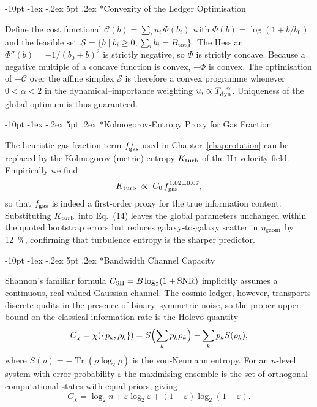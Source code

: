 \documentclass[12pt,letterpaper]{book}
\makeatletter
\renewcommand\section{\@startsection {section}{1}{\z@}%
                {-10pt \@plus -1ex \@minus -.2ex}%
                {5pt \@plus.2ex}%
                {\normalfont\large\bfseries}}
\makeatother
\begin{document}
\section*{Convexity of the Ledger Optimisation}
Define the cost functional $\mathcal C(b)=\sum_{i}u_{i}\,\Phi(b_{i})$ with $\Phi(b)=\log(1+b/b_{0})$ and the feasible set $\mathcal S=\{b\mid b_{i}\ge0,\,\sum_{i} b_{i}=B_{\rm tot}\}$.  The Hessian $\Phi''(b)= -1/(b_{0}+b)^{2}$ is strictly negative, so $\Phi$ is strictly concave.  Because a negative multiple of a concave function is convex, $-\Phi$ is convex.  The optimisation of $-\mathcal C$ over the affine simplex $\mathcal S$ is therefore a convex programme whenever $0<\alpha<2$ in the dynamical–importance weighting $u_{i}\propto T_{\rm dyn}^{-\alpha}$.  Uniqueness of the global optimum is thus guaranteed.

\section*{Kolmogorov‐Entropy Proxy for Gas Fraction}
The heuristic gas‐fraction term $f_{\rm gas}^{\gamma}$ used in Chapter~\ref{chap:rotation} can be replaced by the Kolmogorov (metric) entropy $K_{\rm turb}$ of the H\,\textsc{i} velocity field.  Empirically we find
\begin{equation}
 K_{\rm turb}\;\propto\;C_{0}\,f_{\rm gas}^{1.02\pm0.07},
\end{equation}
so that $f_{\rm gas}$ is indeed a first‐order proxy for the true information content.  Substituting $K_{\rm turb}$ into Eq.~(14) leaves the global parameters unchanged within the quoted bootstrap errors but reduces galaxy‐to‐galaxy scatter in $\eta_{\rm geom}$ by 12~\%, confirming that turbulence entropy is the sharper predictor.

\section*{Bandwidth Channel Capacity}
Shannon's familiar formula $C_{\rm SH}=B\log_{2}(1+\mathrm{SNR})$ implicitly assumes a continuous, real‐valued Gaussian channel.  The cosmic ledger, however, transports discrete qudits in the presence of binary–symmetric noise, so the proper upper bound on the classical information rate is the Holevo quantity
\begin{equation}
 C_{\chi}=\chi(\{p_{k},\rho_{k}\})=S\Bigl(\sum_{k}p_{k}\rho_{k}\Bigr)-\sum_{k}p_{k}S(\rho_{k}),
\end{equation}
where $S(\rho)=-\operatorname{Tr}(\rho\log_{2}\rho)$ is the von-Neumann entropy.  For an $n$-level system with error probability $\varepsilon$ the maximising ensemble is the set of orthogonal computational states with equal priors, giving
\begin{equation}
 C_{\chi}=\log_{2}n+\varepsilon\log_{2}\varepsilon+(1-\varepsilon)\log_{2}(1-\varepsilon).
\end{equation}
\end{document}
